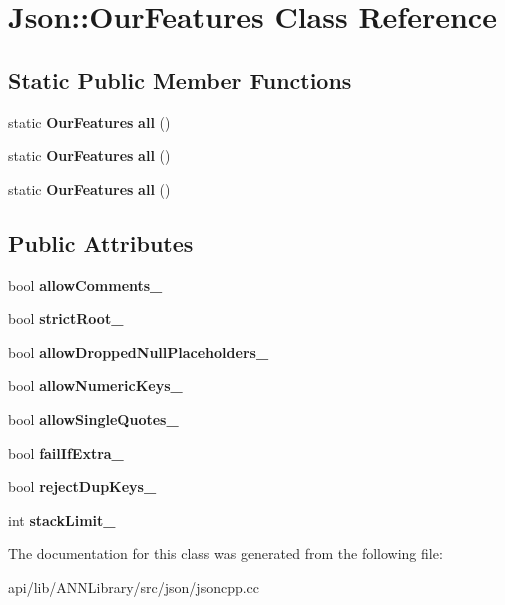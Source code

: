 \section{Json\+:\+:Our\+Features Class Reference}
\label{class_json_1_1_our_features}
\subsection*{Static Public Member Functions}
\begin{DoxyCompactItemize}
\item 
static {\bf Our\+Features} {\bfseries all} ()\label{class_json_1_1_our_features_a0686e1406b6677f496529f9f3fe98d1e}

\item 
static {\bf Our\+Features} {\bfseries all} ()\label{class_json_1_1_our_features_a6ef225b54e7889cc00837c36be5bdb71}

\item 
static {\bf Our\+Features} {\bfseries all} ()\label{class_json_1_1_our_features_a6ef225b54e7889cc00837c36be5bdb71}

\end{DoxyCompactItemize}
\subsection*{Public Attributes}
\begin{DoxyCompactItemize}
\item 
bool {\bfseries allow\+Comments\+\_\+}\label{class_json_1_1_our_features_ac71bb7ba7363d3b05ed76602b036ce33}

\item 
bool {\bfseries strict\+Root\+\_\+}\label{class_json_1_1_our_features_a2095f66a776c0a4ae6cc931a0c94242e}

\item 
bool {\bfseries allow\+Dropped\+Null\+Placeholders\+\_\+}\label{class_json_1_1_our_features_a13963bc44bf948eec1968f7ff8e8f5f1}

\item 
bool {\bfseries allow\+Numeric\+Keys\+\_\+}\label{class_json_1_1_our_features_af6973fc7e774ce2d634ba99442aeb91a}

\item 
bool {\bfseries allow\+Single\+Quotes\+\_\+}\label{class_json_1_1_our_features_abbd6c196d7a22e2a360a59887eda4610}

\item 
bool {\bfseries fail\+If\+Extra\+\_\+}\label{class_json_1_1_our_features_ae8ad25b90706c78f1a8fe929191ac61b}

\item 
bool {\bfseries reject\+Dup\+Keys\+\_\+}\label{class_json_1_1_our_features_a39b8e0b86b1c24a45e800c023bb715aa}

\item 
int {\bfseries stack\+Limit\+\_\+}\label{class_json_1_1_our_features_a9a786713902d14be6d57a08cc03ccfff}

\end{DoxyCompactItemize}


The documentation for this class was generated from the following file\+:\begin{DoxyCompactItemize}
\item 
api/lib/\+A\+N\+N\+Library/src/json/jsoncpp.\+cc\end{DoxyCompactItemize}

